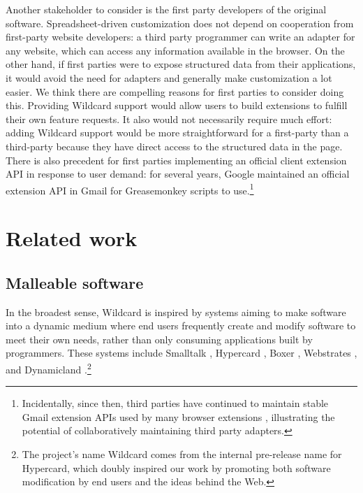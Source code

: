\documentclass[english,submission]{programming}
\begin{document}
Another stakeholder to consider is the first party developers of the
original software. Spreadsheet-driven customization does not depend on
cooperation from first-party website developers: a third party
programmer can write an adapter for any website, which can access any
information available in the browser. On the other hand, if first
parties were to expose structured data from their applications, it would
avoid the need for adapters and generally make customization a lot
easier. We think there are compelling reasons for first parties to
consider doing this. Providing Wildcard support would allow users to
build extensions to fulfill their own feature requests. It also would
not necessarily require much effort: adding Wildcard support would be
more straightforward for a first-party than a third-party because they
have direct access to the structured data in the page. There is also
precedent for first parties implementing an official client extension
API in response to user demand: for several years, Google maintained an
official extension API in Gmail for Greasemonkey scripts to
use.\footnote{Incidentally, since then, third parties have continued to
  maintain stable Gmail extension APIs used by many browser extensions
  \autocite{streak,talwar2019}, illustrating the potential of
  collaboratively maintaining third party adapters.}

\hypertarget{related-work}{%
\section{Related work}\label{related-work}}

\hypertarget{malleable-software}{%
\subsection{Malleable software}\label{malleable-software}}

In the broadest sense, Wildcard is inspired by systems aiming to make
software into a dynamic medium where end users frequently create and
modify software to meet their own needs, rather than only consuming
applications built by programmers. These systems include Smalltalk
\autocite{kay1977}, Hypercard \autocite{hypercard2019} , Boxer
\autocite{disessa1986}, Webstrates \autocite{klokmose2015}, and
Dynamicland \autocite{victor}.\footnote{The project's name Wildcard
  comes from the internal pre-release name for Hypercard, which doubly
  inspired our work by promoting both software modification by end users
  and the ideas behind the Web.}
\end{document}
